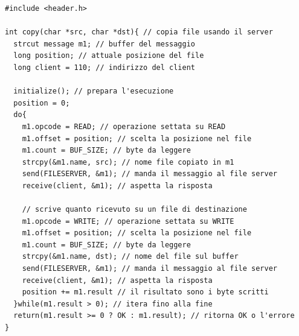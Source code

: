 \documentclass[a4paper,12pt, oneside]{book}
\begin{document}
\begin{verbatim}
#include <header.h>

int copy(char *src, char *dst){ // copia file usando il server
  strcut message m1; // buffer del messaggio
  long position; // attuale posizione del file
  long client = 110; // indirizzo del client
  
  initialize(); // prepara l'esecuzione
  position = 0; 
  do{
    m1.opcode = READ; // operazione settata su READ
    m1.offset = position; // scelta la posizione nel file
    m1.count = BUF_SIZE; // byte da leggere
    strcpy(&m1.name, src); // nome file copiato in m1
    send(FILESERVER, &m1); // manda il messaggio al file server
    receive(client, &m1); // aspetta la risposta
    
    // scrive quanto ricevuto su un file di destinazione
    m1.opcode = WRITE; // operazione settata su WRITE
    m1.offset = position; // scelta la posizione nel file
    m1.count = BUF_SIZE; // byte da leggere
    strcpy(&m1.name, dst); // nome del file sul buffer
    send(FILESERVER, &m1); // manda il messaggio al file server
    receive(client, &m1); // aspetta la risposta
    position += m1.result // il risultato sono i byte scritti
  }while(m1.result > 0); // itera fino alla fine
  return(m1.result >= 0 ? OK : m1.result); // ritorna OK o l'errore
}

\end{verbatim}
\end{document}
